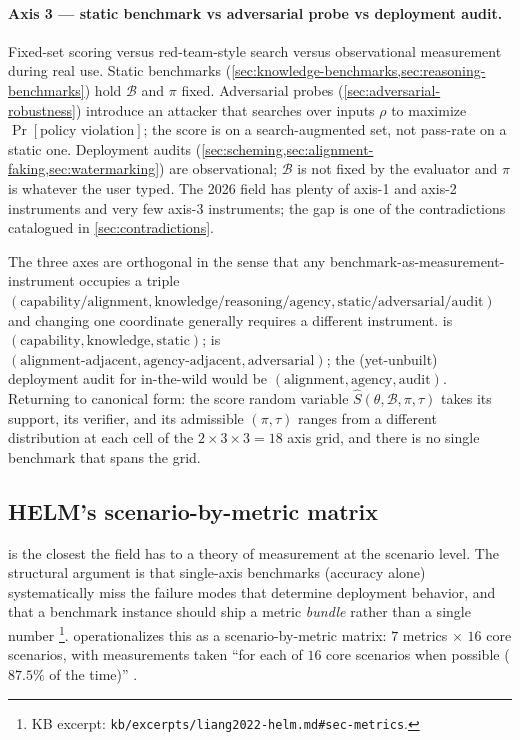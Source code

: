 \paragraph{Axis 3 --- static benchmark vs adversarial probe vs
deployment audit.} Fixed-set scoring versus red-team-style search
versus observational measurement during real use. Static benchmarks
(\cref{sec:knowledge-benchmarks,sec:reasoning-benchmarks}) hold
$\mathcal{B}$ and $\pi$ fixed. Adversarial probes
(\cref{sec:adversarial-robustness}) introduce an attacker that
searches over inputs $\rho$ to maximize $\Pr[\text{policy violation}]$;
the score is  on a search-augmented set, not
pass-rate on a static one. Deployment audits
(\cref{sec:scheming,sec:alignment-faking,sec:watermarking}) are
observational; $\mathcal{B}$ is not fixed by the evaluator and $\pi$
is whatever the user typed. The 2026 field has plenty of axis-1 and
axis-2 instruments and very few axis-3 instruments; the gap is one
of the contradictions catalogued in \cref{sec:contradictions}.

\begin{intuition}
The three axes are orthogonal in the sense that any
benchmark-as-measurement-instrument occupies a triple
$(\text{capability/alignment}, \text{knowledge/reasoning/agency},
\text{static/adversarial/audit})$ and changing one coordinate
generally requires a different instrument.  is
$(\text{capability}, \text{knowledge}, \text{static})$;  is
$(\text{alignment-adjacent}, \text{agency-adjacent},
\text{adversarial})$; the (yet-unbuilt) deployment audit for
in-the-wild  would be
$(\text{alignment}, \text{agency}, \text{audit})$. Returning to
canonical form: the score random variable
$\hat{S}(\theta, \mathcal{B}, \pi, \tau)$ takes its support, its
verifier, and its admissible $(\pi, \tau)$ ranges from a different
distribution at each cell of the $2\times 3\times 3 = 18$ axis grid,
and there is no single benchmark that spans the grid.
\end{intuition}

\subsection{HELM's scenario-by-metric matrix}
\label{sec:measuring-helm}

 \citep{liang2022-helm} is the closest the field has to a
theory of measurement at the scenario level. The structural argument
is that single-axis benchmarks (accuracy alone) systematically miss
the failure modes that determine deployment behavior, and that a
benchmark instance should ship a metric \emph{bundle} rather than a
single number%
\footnote{KB excerpt: \nolinkurl{kb/excerpts/liang2022-helm.md#sec-metrics}.}.
 operationalizes this as a scenario-by-metric matrix: $7$ metrics
$\times$ $16$ core scenarios, with measurements taken
``for each of $16$ core scenarios when possible ($87.5\%$ of the
time)'' \citep[\S{}abstract]{liang2022-helm}.

